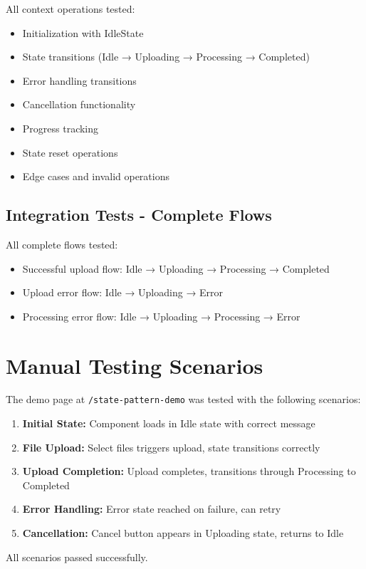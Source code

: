 \documentclass[11pt,a4paper]{article}
\begin{document}
All context operations tested:
\begin{itemize}
    \item Initialization with IdleState
    \item State transitions (Idle → Uploading → Processing → Completed)
    \item Error handling transitions
    \item Cancellation functionality
    \item Progress tracking
    \item State reset operations
    \item Edge cases and invalid operations
\end{itemize}

\subsection{Integration Tests - Complete Flows}

All complete flows tested:
\begin{itemize}
    \item Successful upload flow: Idle → Uploading → Processing → Completed
    \item Upload error flow: Idle → Uploading → Error
    \item Processing error flow: Idle → Uploading → Processing → Error
\end{itemize}

\section{Manual Testing Scenarios}

The demo page at \texttt{/state-pattern-demo} was tested with the following scenarios:

\begin{enumerate}
    \item \textbf{Initial State:} Component loads in Idle state with correct message
    \item \textbf{File Upload:} Select files triggers upload, state transitions correctly
    \item \textbf{Upload Completion:} Upload completes, transitions through Processing to Completed
    \item \textbf{Error Handling:} Error state reached on failure, can retry
    \item \textbf{Cancellation:} Cancel button appears in Uploading state, returns to Idle
\end{enumerate}

All scenarios passed successfully.
\end{document}
